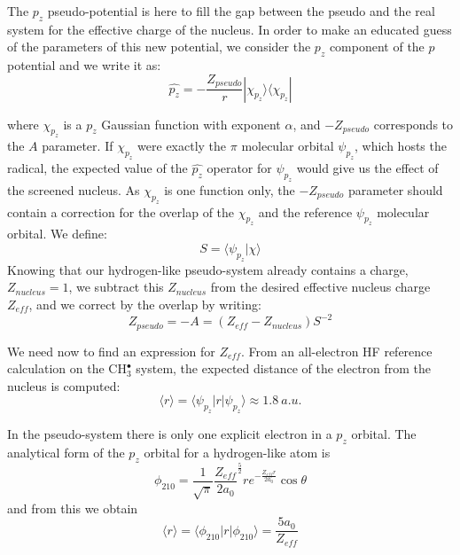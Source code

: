 \documentclass[aip]{revtex4-1}
\begin{document}
The  \(p_{z}\) pseudo-potential is here to fill the gap between the pseudo and the real system 
for the effective charge of the nucleus. 
In order to make an educated guess of the parameters of this new potential, we 
consider  the $p_z$ component of the $p$ potential and we write it as:
\begin{equation}
\widehat{p_z} = -\frac{Z_{pseudo}}{r} | \chi_{p_z} \rangle \langle \chi_{p_z} |
\end{equation}

where $\chi_{p_z}$ is a $p_z$ Gaussian function with exponent $\alpha$,
and $-{Z_{pseudo}}$ corresponds to the $A$ parameter. 
If $\chi_{p_z}$ were exactly the $\pi$ molecular orbital \(\psi_{p_{z}}\), which hosts the
radical, the expected value of the $\widehat{p_z}$ operator for \(\psi_{p_{z}}\) would
give us the effect of the screened nucleus. 
As $\chi_{p_z}$ is one function only, 
the $-{Z_{pseudo}}$ parameter should contain a
correction for the overlap of the $\chi_{p_z}$ and the reference \(\psi_{p_{z}}\) 
molecular orbital. We define:
\begin{equation}
S = \langle \psi_{p_{z}} | \chi \rangle
\end{equation}
Knowing that our hydrogen-like pseudo-system already contains a charge, \(Z_{nucleus}=1\), 
we subtract this \(Z_{nucleus}\)  from the desired effective nucleus charge \(Z_{eff}\),
and we correct by the overlap by writing: 
\begin{equation}
\label{eq:Zeff}
Z_{pseudo} = -A = (Z_{eff} - Z_{nucleus})S^{-2}
\end{equation}

We need now to find an expression for \(Z_{eff}\). From an all-electron HF
reference calculation on the CH\(^{\bullet}_{3}\) system, the expected 
distance of the electron from the nucleus is computed: 
\begin{equation}
\langle r \rangle = \langle \psi_{p_{z}} | r | \psi_{p_{z}} \rangle \approx 1.8 \ a.u.
\label{equation:exp_r}
\end{equation}

In the pseudo-system there is only one explicit electron in a $p_z$ orbital. 
The analytical form of the \(p_{z}\) orbital for a hydrogen-like atom is\cite{me_structure_theory}
\begin{equation}
\phi_{210} = \frac{1}{\sqrt{\pi}} \frac{Z_{eff}}{2a_{0}} ^{\frac{5}{2}} re^{-\frac{Z_{eff}r}{2a_{0}}} \cos \theta
\end{equation}
and from this we obtain 
\begin{equation}
\label{equation:PsirPsi}
\langle r \rangle = \langle \phi_{210} | r | \phi_{210} \rangle = \frac{5a_{0}}{Z_{eff}}
\end{equation}
\end{document}

